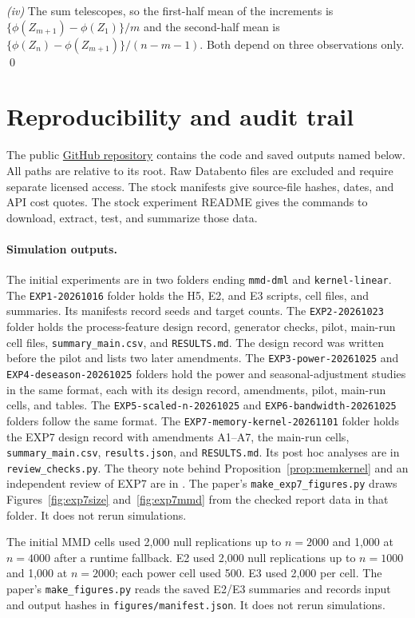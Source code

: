 \documentclass[11pt]{article}
\theoremstyle{remark}
\begin{document}
\emph{(iv)} The sum telescopes, so the first-half mean of the increments is $\{\phi(Z_{m+1})-\phi(Z_1)\}/m$ and the second-half mean is $\{\phi(Z_n)-\phi(Z_{m+1})\}/(n-m-1)$. Both depend on three observations only. \qed

\section{Reproducibility and audit trail}\label{sec:evidence}
The public \href{https://github.com/rockandrolla13/TrackMB3_KernelTestsLongMemory}{GitHub repository} contains the code and saved outputs named below. All paths are relative to its root. Raw Databento files are excluded and require separate licensed access. The stock manifests give source-file hashes, dates, and API cost quotes. The stock experiment README gives the commands to download, extract, test, and summarize those data.

\paragraph{Simulation outputs.} The initial experiments are in two  folders ending \texttt{mmd-dml} and \texttt{kernel-linear}. The \texttt{EXP1-20261016} folder holds the H5, E2, and E3 scripts, cell files, and summaries. Its manifests record seeds and target counts. The \texttt{EXP2-20261023} folder holds the process-feature design record, generator checks, pilot, main-run cell files, \texttt{summary\_main.csv}, and \texttt{RESULTS.md}. The design record was written before the pilot and lists two later amendments. The \texttt{EXP3-power-20261025} and \texttt{EXP4-deseason-20261025} folders hold the power and seasonal-adjustment studies in the same format, each with its design record, amendments, pilot, main-run cells, and tables. The \texttt{EXP5-scaled-n-20261025} and \texttt{EXP6-bandwidth-20261025} folders follow the same format. The \texttt{EXP7-memory-kernel-20261101} folder holds the EXP7 design record with amendments A1--A7, the main-run cells, \texttt{summary\_main.csv}, \texttt{results.json}, and \texttt{RESULTS.md}. Its post hoc analyses are in \texttt{review\_checks.py}. The theory note behind Proposition~\ref{prop:memkernel} and an independent review of EXP7 are in . The paper's \texttt{make\_exp7\_figures.py} draws Figures~\ref{fig:exp7size} and~\ref{fig:exp7mmd} from the checked report data in that folder. It does not rerun simulations.

The initial MMD cells used 2,000 null replications up to $n=2000$ and 1,000 at $n=4000$ after a runtime fallback. E2 used 2,000 null replications up to $n=1000$ and 1,000 at $n=2000$; each power cell used 500. E3 used 2,000 per cell. The paper's \texttt{make\_figures.py} reads the saved E2/E3 summaries and records input and output hashes in \texttt{figures/manifest.json}. It does not rerun simulations.
\end{document}
